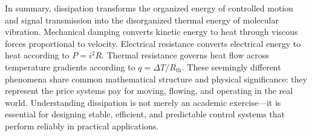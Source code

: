 In summary, dissipation transforms the organized energy of controlled motion and signal transmission into the disorganized thermal energy of molecular vibration. Mechanical damping converts kinetic energy to heat through viscous forces proportional to velocity. Electrical resistance converts electrical energy to heat according to $P = i^2 R$. Thermal resistance governs heat flow across temperature gradients according to $q = \Delta T/R_{\text{th}}$. These seemingly different phenomena share common mathematical structure and physical significance: they represent the price systems pay for moving, flowing, and operating in the real world. Understanding dissipation is not merely an academic exercise—it is essential for designing stable, efficient, and predictable control systems that perform reliably in practical applications.
